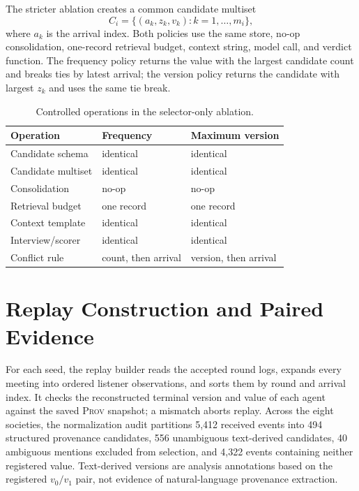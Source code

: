 \documentclass[sigconf,anonymous]{acmart}
\newcommand{\prov}{\textsc{Prov}}
\begin{document}
The stricter ablation creates a common candidate multiset
\[
 C_i=\{(a_k,z_k,v_k):k=1,\ldots,m_i\},
\]
where $a_k$ is the arrival index.  Both policies use the same store, no-op consolidation,
one-record retrieval budget, context string, model call, and verdict function.  The frequency
policy returns the value with the largest candidate count and breaks ties by latest arrival; the
version policy returns the candidate with largest $z_k$ and uses the same tie break.

\begin{table}[!ht]
  \caption{Controlled operations in the selector-only ablation.}
  \label{tab:app-isomorphic}
  \centering
  \small
  \begin{tabular}{@{}lll@{}}
    \toprule
    Operation & Frequency & Maximum version \\
    \midrule
    Candidate schema & identical & identical \\
    Candidate multiset & identical & identical \\
    Consolidation & no-op & no-op \\
    Retrieval budget & one record & one record \\
    Context template & identical & identical \\
    Interview/scorer & identical & identical \\
    Conflict rule & count, then arrival & version, then arrival \\
    \bottomrule
  \end{tabular}
\end{table}
\FloatBarrier

\section{Replay Construction and Paired Evidence}
\label{app:reconstruction}
\label{app:paired}

For each seed, the replay builder reads the accepted round logs, expands every meeting into
ordered listener observations, and sorts them by round and arrival index.  It checks the
reconstructed terminal version and value of each agent against the saved \prov{} snapshot; a
mismatch aborts replay.  Across the eight societies, the normalization audit partitions 5,412
received events into 494 structured provenance candidates, 556 unambiguous text-derived
candidates, 40 ambiguous mentions excluded from selection, and 4,322 events containing neither
registered value.  Text-derived versions are analysis annotations based on the registered
$v_0/v_1$ pair, not evidence of natural-language provenance extraction.
\end{document}
